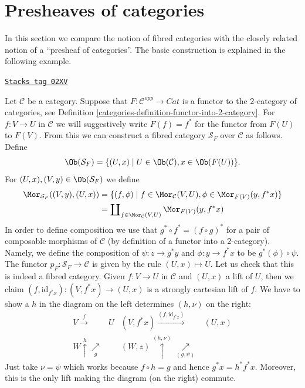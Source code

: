 \section{Presheaves of categories}
\label{categories-section-presheaves-categories}
In this section we compare the notion of fibred categories
with the closely related notion of a ``presheaf of categories''.
The basic construction is explained in the following example.

\begin{example}
\label{categories-example-functor-categories}
\href{https://stacks.math.columbia.edu/tag/02XV}{\texttt{Stacks tag 02XV}}

Let $\mathcal{C}$ be a category.
Suppose that $F : \mathcal{C}^{opp} \to \textit{Cat}$ is a functor
to the $2$-category of categories, see
Definition \ref{categories-definition-functor-into-2-category}.
For $f : V \to U$ in $\mathcal{C}$ we will
suggestively write $F(f) = f^\ast$ for the functor from $F(U)$ to $F(V)$.
From this we can construct a fibred category $\mathcal{S}_F$ over
$\mathcal{C}$ as follows. Define
$$
\Ob(\mathcal{S}_F) =
\{(U, x) \mid U\in \Ob(\mathcal{C}), x\in \Ob(F(U))\}.
$$
For $(U, x), (V, y) \in \Ob(\mathcal{S}_F)$ we define
\begin{align*}
\Mor_{\mathcal{S}_F}((V, y), (U, x)) & =
\{ (f, \phi) \mid f \in \Mor_\mathcal{C}(V, U),
\phi \in \Mor_{F(V)}(y, f^\ast x)\} \\
& =
\coprod\nolimits_{f \in \Mor_\mathcal{C}(V, U)}
\Mor_{F(V)}(y, f^\ast x)
\end{align*}
In order to define composition we use that $g^\ast \circ f^\ast =
(f \circ g)^\ast$ for a pair of composable morphisms of $\mathcal{C}$
(by definition of a functor into a $2$-category).
Namely, we define the composition of $\psi : z \to g^\ast y$ and
$ \phi : y \to f^\ast x$ to be $ g^\ast(\phi) \circ \psi$. The functor
$p_F : \mathcal{S}_F \to \mathcal{C}$ is given by the rule
$(U, x) \mapsto U$.
Let us check that this is indeed a fibred category.
Given $f: V \to U$ in $\mathcal{C}$ and $(U, x)$ a lift of $U$, then
we claim $(f, \text{id}_{f^\ast x}): (V, {f^\ast x}) \to (U, x)$ is a
strongly cartesian lift of $f$.
We have to show a $h$ in the diagram on the left
determines $(h, \nu)$ on the right:
$$
\begin{array}{cccc}V \overset{f}{\longrightarrow} & U & (V, f^*x) \overset{(f, \text{id}_{f^*x})}{\longrightarrow} & (U, x) \\ W \overset{h}{\uparrow}\underset{g}{\nearrow} &  & (W, z) \overset{(h, \nu)}{\uparrow}\underset{(g, \psi)}{\nearrow} & \end{array}
$$
Just take $\nu = \psi$ which works because $f \circ h = g$
and hence $g^*x = h^*f^*x$. Moreover, this is the only lift
making the diagram (on the right) commute.
\end{example}

